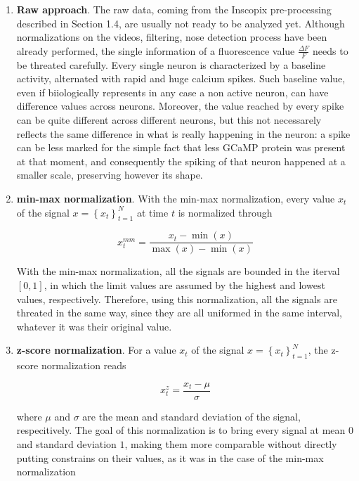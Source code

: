 \documentclass[a4paper]{article}
\begin{document}
\begin{enumerate}
	
	\item \textbf{Raw approach}. The raw data, coming from the Inscopix pre-processing described in Section 1.4, are usually not ready to be analyzed yet. Although normalizations on the videos, filtering, nose detection process have been already performed, the single information of a fluorescence value $\frac{\Delta F}{F}$ needs to be threated carefully. Every single neuron is characterized by a baseline activity, alternated with rapid and huge calcium spikes. Such baseline value, even if biiologically represents in any case a non active neuron, can have difference values across neurons. Moreover, the value reached by every spike can be quite different across different neurons, but this not necessarely reflects the same difference in what is really happening in the neuron: a spike can be less marked for the simple fact that less GCaMP protein was present at that moment, and consequently the spiking of that neuron happened at a smaller scale, preserving however its shape. 
	
	\item \textbf{min-max normalization}. With the min-max normalization, every value $x_t$ of the signal $ x = \left\{ x_t\right\}_{t=1}^N$ at time $t$ is normalized through
	
	\begin{equation}
		x_t^{mm} = \frac{x_t -  \min(x)}{\max(x) - \min(x)}
	\end{equation}
	
	With the min-max normalization, all the signals are bounded in the iterval $[0,1]$, in which the limit values are assumed by the highest and lowest values, respectively. Therefore, using this normalization, all the signals are threated in the same way, since they are all uniformed in the same interval, whatever it was their original value.
	
	\item \textbf{z-score normalization}. For a value  $x_t$ of the signal $ x = \left\{ x_t\right\}_{t=1}^N$, the z-score normalization reads
	
	\begin{equation}
	x_t^{z} = \frac{x_t -  \mu}{\sigma}
	\end{equation}
	
	where $\mu$ and $\sigma$ are the mean and standard deviation of the signal, respecitively. The goal of this normalization is to bring every signal at mean $0$ and standard deviation $1$, making them more comparable without directly putting constrains on their values, as it was in the case of the min-max normalization


\end{enumerate}
	
\end{document}
